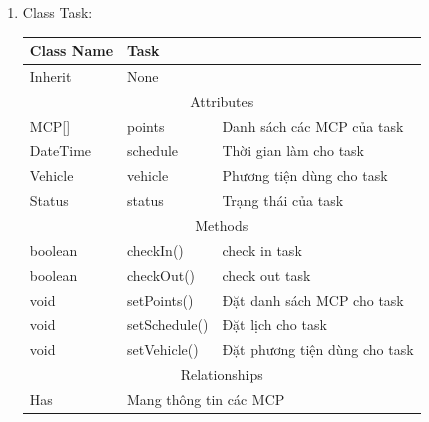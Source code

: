 \begin{enumerate}
        \item Class Task:
        \begin{table}[htp]
            \begin{tabular}{|lll|}
                \hline
                \multicolumn{1}{|l|}{Class Name} & \multicolumn{2}{l|}{Task}                                          \\ \hline
                \multicolumn{1}{|l|}{Inherit}    & \multicolumn{2}{l|}{None}                                          \\ \hline
                \multicolumn{3}{|c|}{\cellcolor[HTML]{FFFFC7}Attributes}                                              \\ \hline
                \multicolumn{1}{|l|}{MCP{[}{]}}  & \multicolumn{1}{l|}{points}        & Danh sách các MCP của task    \\ \hline
                \multicolumn{1}{|l|}{DateTime}   & \multicolumn{1}{l|}{schedule}      & Thời gian làm cho task        \\ \hline
                \multicolumn{1}{|l|}{Vehicle}    & \multicolumn{1}{l|}{vehicle}       & Phương tiện dùng cho task     \\ \hline
                \multicolumn{1}{|l|}{Status}     & \multicolumn{1}{l|}{status}        & Trạng thái của task           \\ \hline
                \multicolumn{3}{|c|}{\cellcolor[HTML]{FFFFC7}Methods}                                                 \\ \hline
                \multicolumn{1}{|l|}{boolean}    & \multicolumn{1}{l|}{checkIn()}     & check in task                 \\ \hline
                \multicolumn{1}{|l|}{boolean}    & \multicolumn{1}{l|}{checkOut()}    & check out task                \\ \hline
                \multicolumn{1}{|l|}{void}       & \multicolumn{1}{l|}{setPoints()}   & Đặt danh sách MCP cho task    \\ \hline
                \multicolumn{1}{|l|}{void}       & \multicolumn{1}{l|}{setSchedule()} & Đặt lịch cho task             \\ \hline
                \multicolumn{1}{|l|}{void}       & \multicolumn{1}{l|}{setVehicle()}  & Đặt phương tiện dùng cho task \\ \hline
                \multicolumn{3}{|c|}{\cellcolor[HTML]{FFFFC7}Relationships}                                           \\ \hline
                \multicolumn{1}{|l|}{Has}        & \multicolumn{2}{l|}{Mang thông tin các MCP}                        \\ \hline
            \end{tabular}
        \end{table}
            

\end{enumerate}
